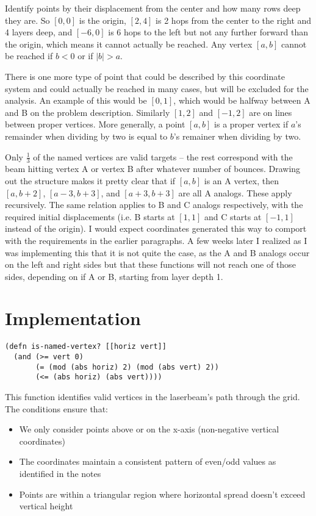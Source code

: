 \documentclass{article}
\begin{document}
\par

Identify points by their displacement from the center and how many rows deep they are.  So $[0, 0]$ is the origin, $[2, 4]$ is 2 hops from the center to the right and 4 layers deep, and $[-6, 0]$ is 6 hops to the left but not any further forward than the origin, which means it cannot actually be reached.  Any vertex $[a, b]$ cannot be reached if $b < 0$ or if $|b| > a$.

\par

There is one more type of point that could be described by this coordinate system and could actually be reached in many cases, but will be excluded for the analysis.  An example of this would be $[0, 1]$, which would be halfway between A and B on the problem description.  Similarly $[1, 2]$ and $[-1, 2]$ are on lines between proper vertices.  More generally, a point $[a, b]$ is a proper vertex if $a$'s remainder when dividing by two is equal to $b$'s remainer when dividing by two.

\par

Only ${\frac{1}{3}}$ of the named vertices are valid targets -- the rest correspond with the beam hitting vertex A or vertex B after whatever number of bounces.  Drawing out the structure makes it pretty clear that if $[a, b]$ is an A vertex, then $[a, b + 2]$, $[a - 3, b + 3]$, and $[a + 3, b + 3]$ are all A analogs.  These apply recursively.  The same relation applies to B and C analogs respectively, with the required initial displacements (i.e. B starts at $[1, 1]$ and C starts at $[-1, 1]$ instead of the origin).  I would expect coordinates generated this way to comport with the requirements in the earlier paragraphs.  A few weeks later I realized as I was implementing this that it is not quite the case, as the A and B analogs occur on the left and right sides but that these functions will not reach one of those sides, depending on if A or B, starting from layer depth 1.

\section*{Implementation}
\begin{lstlisting}
(defn is-named-vertex? [[horiz vert]]
  (and (>= vert 0)
       (= (mod (abs horiz) 2) (mod (abs vert) 2))
       (<= (abs horiz) (abs vert))))
\end{lstlisting}

This function identifies valid vertices in the laserbeam's path through the grid. The conditions ensure that:
\begin{itemize}
    \item We only consider points above or on the x-axis (non-negative vertical coordinates)
    \item The coordinates maintain a consistent pattern of even/odd values as identified in the notes
    \item Points are within a triangular region where horizontal spread doesn't exceed vertical height
\end{itemize}


\end{document}
